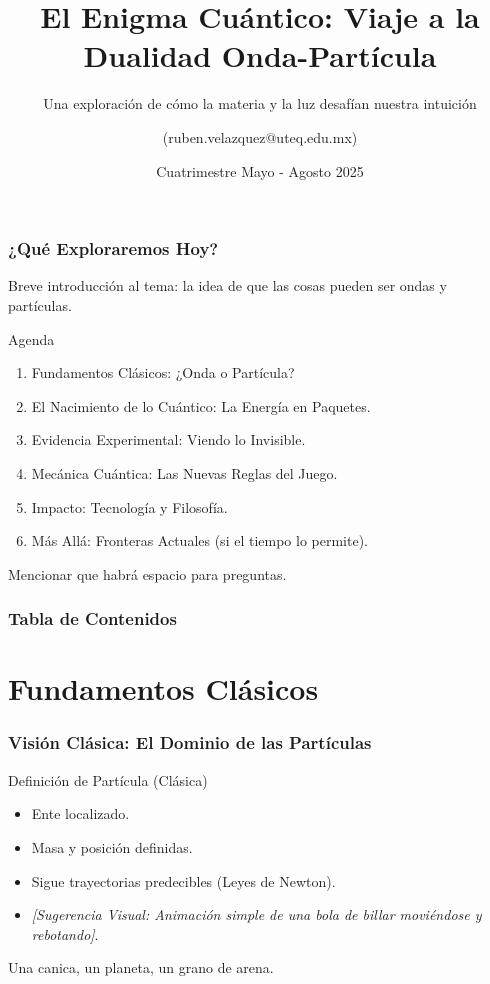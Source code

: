 \documentclass{beamer}
\title[Dualidad Onda-Partícula]{El Enigma Cuántico: Viaje a la Dualidad Onda-Partícula}
\subtitle{Una exploración de cómo la materia y la luz desafían nuestra intuición}
\author{(ruben.velazquez@uteq.edu.mx)}
\institute[UTEQ]{Universidad Tecnológica de Querétaro}
\date{Cuatrimestre Mayo - Agosto 2025}
\begin{document}
	
	\begin{frame}
		\titlepage
	\end{frame}
	
	\begin{frame}
		\frametitle{¿Qué Exploraremos Hoy?}
		\pause
		Breve introducción al tema: la idea de que las cosas pueden ser ondas y partículas.
		\pause
		\begin{block}{Agenda}
			\begin{enumerate}
				\item Fundamentos Clásicos: ¿Onda o Partícula? \pause
				\item El Nacimiento de lo Cuántico: La Energía en Paquetes. \pause
				\item Evidencia Experimental: Viendo lo Invisible. \pause
				\item Mecánica Cuántica: Las Nuevas Reglas del Juego. \pause
				\item Impacto: Tecnología y Filosofía. \pause
				\item Más Allá: Fronteras Actuales (si el tiempo lo permite).
			\end{enumerate}
		\end{block}
		\pause
		\begin{alertblock}{}
			Mencionar que habrá espacio para preguntas.
		\end{alertblock}
	\end{frame}
	
	\begin{frame}
		\frametitle{Tabla de Contenidos}
		\tableofcontents
	\end{frame}
	
	\section{Fundamentos Clásicos}
	
	\begin{frame}
		\frametitle{Visión Clásica: El Dominio de las Partículas}
		\begin{block}{Definición de Partícula (Clásica)}
			\begin{itemize}
				\item Ente localizado.
				\item Masa y posición definidas.
				\item Sigue trayectorias predecibles (Leyes de Newton).
				\item \textit{[Sugerencia Visual: Animación simple de una bola de billar moviéndose y rebotando]}.
			\end{itemize}
		\end{block}
		\pause
		\begin{examples}
			Una canica, un planeta, un grano de arena.
		\end{examples}
	\end{frame}
	
\end{document}
